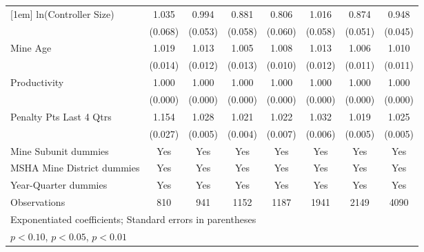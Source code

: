 {\begin{tabular}{l*{7}{c}}
[1em]
ln(Controller Size)      &       1.035         &       0.994         &       0.881\sym{*}  &       0.806\sym{***}&       1.016         &       0.874\sym{**} &       0.948         \\
                         &     (0.068)         &     (0.053)         &     (0.058)         &     (0.060)         &     (0.058)         &     (0.051)         &     (0.045)         \\
[1em]
Mine Age                 &       1.019         &       1.013         &       1.005         &       1.008         &       1.013         &       1.006         &       1.010         \\
                         &     (0.014)         &     (0.012)         &     (0.013)         &     (0.010)         &     (0.012)         &     (0.011)         &     (0.011)         \\
[1em]
Productivity             &       1.000         &       1.000         &       1.000\sym{*}  &       1.000         &       1.000         &       1.000         &       1.000\sym{**} \\
                         &     (0.000)         &     (0.000)         &     (0.000)         &     (0.000)         &     (0.000)         &     (0.000)         &     (0.000)         \\
[1em]
Penalty Pts Last 4 Qtrs  &       1.154\sym{***}&       1.028\sym{***}&       1.021\sym{***}&       1.022\sym{***}&       1.032\sym{***}&       1.019\sym{***}&       1.025\sym{***}\\
                         &     (0.027)         &     (0.005)         &     (0.004)         &     (0.007)         &     (0.006)         &     (0.005)         &     (0.005)         \\
[1em]
Mine Subunit dummies     &         Yes         &         Yes         &         Yes         &         Yes         &         Yes         &         Yes         &         Yes         \\
[1em]
MSHA Mine District dummies&         Yes         &         Yes         &         Yes         &         Yes         &         Yes         &         Yes         &         Yes         \\
[1em]
Year-Quarter dummies     &         Yes         &         Yes         &         Yes         &         Yes         &         Yes         &         Yes         &         Yes         \\
\hline
Observations             &         810         &         941         &        1152         &        1187         &        1941         &        2149         &        4090         \\
\hline\hline
\multicolumn{8}{l}{\footnotesize Exponentiated coefficients; Standard errors in parentheses}\\
\multicolumn{8}{l}{\footnotesize \sym{*} \(p<0.10\), \sym{**} \(p<0.05\), \sym{***} \(p<0.01\)}\\
\end{tabular}
}
